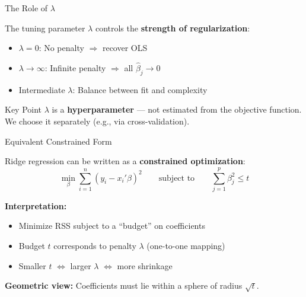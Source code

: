 \documentclass[10pt]{beamer}
\newcommand{\highlight}[1]{\textcolor{AccentOrange}{\textbf{#1}}}
\begin{document}
\begin{frame}{The Role of $\lambda$}

The tuning parameter $\lambda$ controls the \highlight{strength of regularization}:

\vspace{1em}
\begin{itemize}
  \item $\lambda = 0$: No penalty $\Rightarrow$ recover OLS
  
  \vspace{0.5em}
  \item $\lambda \to \infty$: Infinite penalty $\Rightarrow$ all $\widehat{\beta}_j \to 0$
  
  \vspace{0.5em}
  \item Intermediate $\lambda$: Balance between fit and complexity
\end{itemize}

\vspace{1em}
\begin{block}{Key Point}
$\lambda$ is a \highlight{hyperparameter} --- not estimated from the objective function. We choose it separately (e.g., via cross-validation).
\end{block}

\end{frame}


\begin{frame}{Equivalent Constrained Form}

Ridge regression can be written as a \textbf{constrained optimization}:
\[
\min_\beta \sum_{i=1}^n (y_i - x_i'\beta)^2 \qquad \text{subject to} \qquad \sum_{j=1}^p \beta_j^2 \leq t
\]

\vspace{1em}
\textbf{Interpretation:}
\begin{itemize}
  \item Minimize RSS subject to a ``budget'' on coefficients
  \item Budget $t$ corresponds to penalty $\lambda$ (one-to-one mapping)
  \item Smaller $t$ $\Leftrightarrow$ larger $\lambda$ $\Leftrightarrow$ more shrinkage
\end{itemize}

\vspace{1em}
\textbf{Geometric view:} Coefficients must lie within a sphere of radius $\sqrt{t}$.

\end{frame}
\end{document}
